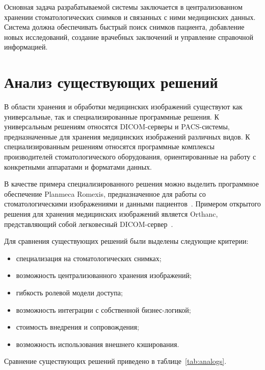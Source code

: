 Основная задача разрабатываемой системы заключается в централизованном хранении стоматологических снимков и связанных с ними медицинских данных. Система должна обеспечивать быстрый поиск снимков пациента, добавление новых исследований, создание врачебных заключений и управление справочной информацией.

\section{Анализ существующих решений}

В области хранения и обработки медицинских изображений существуют как универсальные, так и специализированные программные решения. К универсальным решениям относятся DICOM-серверы и PACS-системы, предназначенные для хранения медицинских изображений различных видов. К специализированным решениям относятся программные комплексы производителей стоматологического оборудования, ориентированные на работу с конкретными аппаратами и форматами данных.

В качестве примера специализированного решения можно выделить программное обеспечение Planmeca Romexis, предназначенное для работы со стоматологическими изображениями и данными пациентов~\cite{romexis}. Примером открытого решения для хранения медицинских изображений является Orthanc, представляющий собой легковесный DICOM-сервер~\cite{orthanc}.

Для сравнения существующих решений были выделены следующие критерии:
\begin{itemize}
	\item специализация на стоматологических снимках;
	\item возможность централизованного хранения изображений;
	\item гибкость ролевой модели доступа;
	\item возможность интеграции с собственной бизнес-логикой;
	\item стоимость внедрения и сопровождения;
	\item возможность использования внешнего кэширования.
\end{itemize}

Сравнение существующих решений приведено в таблице~\ref{tab:analogs}.

